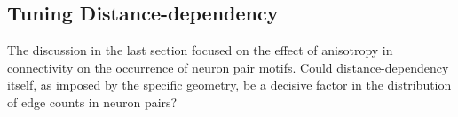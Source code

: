 \subsection{Tuning Distance-dependency}\label{sec:tuned_networks}

The discussion in the last section focused on the effect of anisotropy
in connectivity on the occurrence of neuron pair motifs. Could
distance-dependency itself, as imposed by the specific geometry, be a
decisive factor in the distribution of edge counts in neuron pairs?




